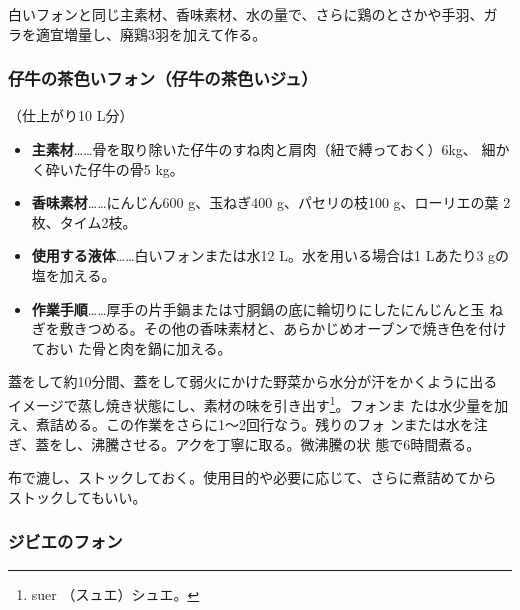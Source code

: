 \begin{recette}
白いフォンと同じ主素材、香味素材、水の量で、さらに鶏のとさかや手羽、ガ
ラを適宜増量し、廃鶏3羽を加えて作る。

\hypertarget{jus-de-veau-brun}{%
\subsubsection{仔牛の茶色いフォン（仔牛の茶色いジュ）}\label{jus-de-veau-brun}}



（仕上がり10 L分）

\begin{itemize}
\item
  \textbf{主素材}\ldots{}\ldots{}骨を取り除いた仔牛のすね肉と肩肉（紐で縛っておく）6kg、
  細かく砕いた仔牛の骨5 kg。
\item
  \textbf{香味素材}\ldots{}\ldots{}にんじん600 g、玉ねぎ400
  g、パセリの枝100 g、ローリエの葉 2枚、タイム2枝。
\item
  \textbf{使用する液体}\ldots{}\ldots{}白いフォンまたは水12
  L。水を用いる場合は1 Lあたり3 gの塩を加える。
\item
  \textbf{作業手順}\ldots{}\ldots{}厚手の片手鍋または寸胴鍋の底に輪切りにしたにんじんと玉
  ねぎを敷きつめる。その他の香味素材と、あらかじめオーブンで焼き色を付けておい
  た骨と肉を鍋に加える。
\end{itemize}

蓋をして約10分間、蓋をして弱火にかけた野菜から水分が汗をかくように出る
イメージで蒸し焼き状態にし、素材の味を引き出す\footnote{suer
  （スュエ）シュエ。}。フォンま
たは水少量を加え、煮詰める。この作業をさらに1〜2回行なう。残りのフォ
ンまたは水を注ぎ、蓋をし、沸騰させる。アクを丁寧に取る。微沸騰の状
態で6時間煮る。

布で漉し、ストックしておく。使用目的や必要に応じて、さらに煮詰めてから
ストックしてもいい。

\hypertarget{fonds-de-gibier}{%
\subsubsection{ジビエのフォン}\label{fonds-de-gibier}}


\end{recette}
